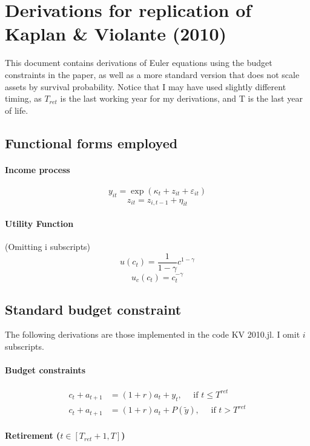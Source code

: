 \documentclass[11pt]{article}
\author{}
\date{}
\title{}
\begin{document}
\section*{Derivations for replication of Kaplan \& Violante (2010)}
This document contains derivations of Euler equations using the budget constraints in the paper, as well as a more standard version that does not scale assets by survival probability. Notice that I may have used slightly different timing, as $T_{ret}$ is the last working year for my derivations, and T is the last year of life.

\subsection*{Functional forms employed}

\paragraph{Income process}
$$ y_{i t} =  \exp( \kappa_t + z_{i t} + \varepsilon_{i t})$$
$$ z_{i t} = z_{i,t-1} + \eta_{i t} $$

\paragraph{Utility Function}
(Omitting i subscripts)
$$ u(c_t) = \frac{1}{1-\gamma} c^{1-\gamma} $$
$$ u_c(c_t) = c_t^{-\gamma} $$


\subsection*{Standard budget constraint}

The following derivations are those implemented in the code {KV 2010.jl}. I omit $i$ subscripts.

\paragraph{Budget constraints}
$$
\begin{aligned}
c_{t}+a_{t+1} &=(1+r) a_{t}+y_{t}, \quad \text { if } t \leq T^{r e t}\\
c_{t} + a_{t+1} &= (1+r) a_{t}+P\left(\tilde{y}\right), \quad \text { if } t > T^{r e t}
\end{aligned}
$$

\paragraph{Retirement ($t \in [T_{ret}+1, T]$)}
\end{document}
